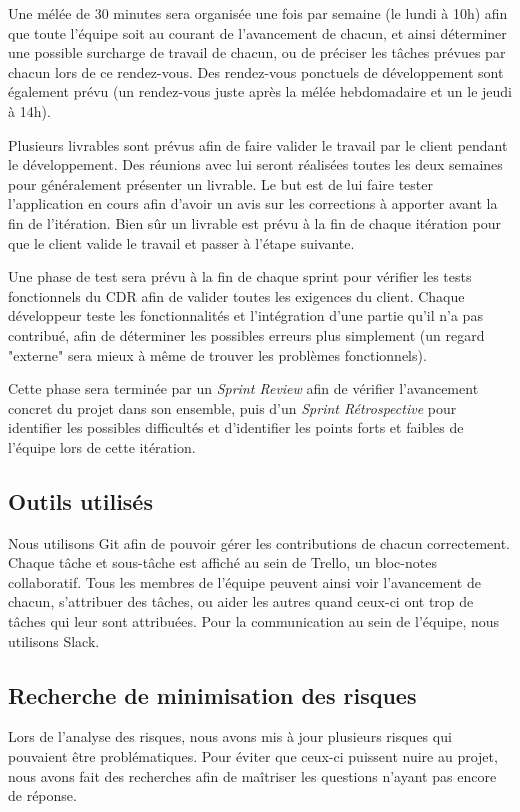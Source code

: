 \documentclass[hidelinks, 10pt,a4paper]{article}
\begin{document}
  Une mélée de 30 minutes sera organisée une fois par semaine (le lundi à 10h) afin que toute
  l'équipe soit au courant de l'avancement de chacun, et ainsi déterminer une possible surcharge
  de travail de chacun, ou de préciser les tâches prévues par chacun lors de ce rendez-vous.
  Des rendez-vous ponctuels de développement sont également prévu (un rendez-vous juste après la mélée hebdomadaire et un le jeudi à 14h).
  
  Plusieurs livrables sont prévus afin de faire valider le travail par le client pendant le développement. Des réunions avec
  lui seront réalisées toutes les deux semaines pour généralement présenter un livrable. Le but est de lui faire
  tester l'application en cours afin d'avoir un avis sur les corrections à apporter avant la fin de l'itération.
  Bien sûr un livrable est prévu à la fin de chaque itération pour que le client valide le travail et passer à l'étape suivante.
  
  Une phase de test sera prévu à la fin de chaque sprint pour vérifier les tests fonctionnels
  du CDR afin de valider toutes les exigences du client.
  Chaque développeur teste les fonctionnalités et l'intégration d'une partie qu'il n'a pas contribué, afin de
  déterminer les possibles erreurs plus simplement (un regard "externe" sera mieux à même
  de trouver les problèmes fonctionnels). 
  
  Cette phase sera terminée par un \emph{Sprint Review}
  afin de vérifier l'avancement concret du projet dans son ensemble, puis d'un \emph{Sprint Rétrospective}
  pour identifier les possibles difficultés et d'identifier les points forts et faibles de l'équipe
  lors de cette itération.

\subsection{Outils utilisés}
Nous utilisons Git afin de pouvoir gérer les contributions de chacun correctement.
Chaque tâche et sous-tâche est affiché au sein de Trello, un bloc-notes collaboratif.
Tous les membres de l'équipe peuvent ainsi voir l'avancement de chacun, s'attribuer
des tâches, ou aider les autres quand ceux-ci ont trop de tâches qui leur sont
attribuées. Pour la communication au sein de l'équipe, nous utilisons Slack.

\subsection{Recherche de minimisation des risques}
Lors de l'analyse des risques, nous avons mis à jour plusieurs risques qui pouvaient
être problématiques. Pour éviter que ceux-ci puissent nuire au projet, nous avons
fait des recherches afin de maîtriser les questions n'ayant pas encore de réponse.
\end{document}
